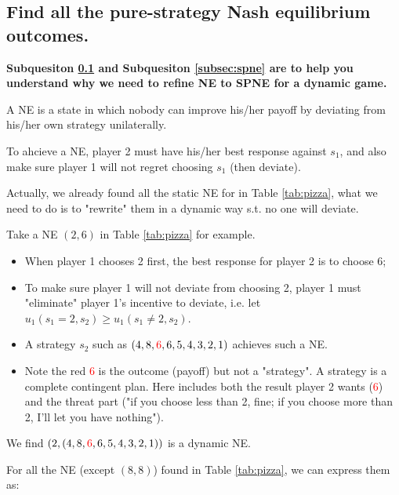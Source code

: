 \documentclass{article}
\begin{document}
%
\subsection{Find all the pure-strategy Nash equilibrium outcomes. }
\label{subsec:ne}

\begin{mdframed}[backgroundcolor=blue!20,linecolor=white]

\textbf{Subquesiton \ref{subsec:ne} and Subquesiton \ref{subsec:spne} are to help you
understand why we need to refine NE to SPNE for a dynamic game.}
\medskip

A NE is a state in which nobody can improve his/her payoff by deviating from his/her own strategy unilaterally.

\smallskip

To ahcieve a NE, player 2 must have his/her best response against $s_1$, and also make sure player 1 will not regret choosing $s_1$ (then deviate).

\medskip

Actually, we already found all the static NE for in Table \ref{tab:pizza}, what we need to do is to "rewrite" them in a dynamic way s.t. no one will deviate.

\smallskip

Take a NE $(2,6)$ in Table \ref{tab:pizza} for example.

\begin{itemize}
\item When player 1 chooses 2 first, the best response for player 2 is to choose 6;
\item To make sure player 1 will not deviate from choosing 2, player 1 must "eliminate" player 1's incentive to deviate, i.e. let $u_1(s_1=2,s_2) \ge u_1(s_1 \ne 2,s_2)$.
\item A strategy $s_2$ such as $(4,8,\textcolor{red}{6},6,5,4,3,2,1)$ achieves such a NE. 
\item Note the red \textcolor{red}{6} is the outcome (payoff) but not a "strategy". A strategy is a complete contingent plan. Here includes both the result player 2 wants (\textcolor{red}{6}) and the threat part ("if you choose less than 2, fine; if you choose more than 2, I'll let you have nothing").
\end{itemize}

We find $(2,(4,8,\textcolor{red}{6},6,5,4,3,2,1))$ is a dynamic NE.
\medskip

For all the NE (except $(8,8)$) found in Table \ref{tab:pizza}, we can express them as:
\smallskip


\end{mdframed}
\end{document}

